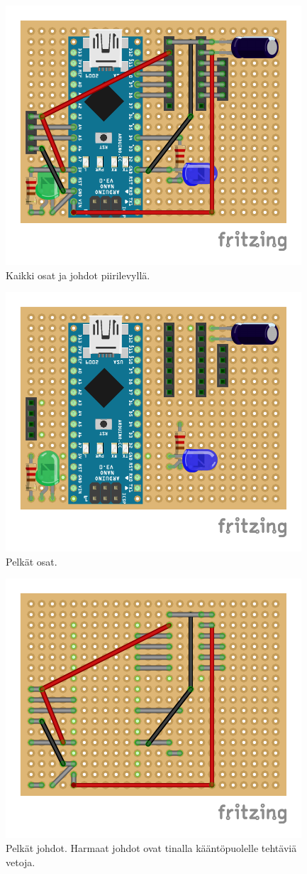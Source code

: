 \documentclass[12pt,a4paper]{article}
\begin{document}
    \begin{figure}
        \centering
        \includegraphics{piirilevy2_kaikki}
        \caption{Kaikki osat ja johdot piirilevyllä.}
    \end{figure}

    \begin{figure}
        \centering
        \includegraphics{piirilevy2_osat}
        \caption{Pelkät osat.}
    \end{figure}

    \begin{figure}
        \centering
        \includegraphics{piirilevy2_johdot}
        \caption{Pelkät johdot. Harmaat johdot ovat tinalla kääntöpuolelle tehtäviä vetoja.}
    \end{figure}
\end{document}
